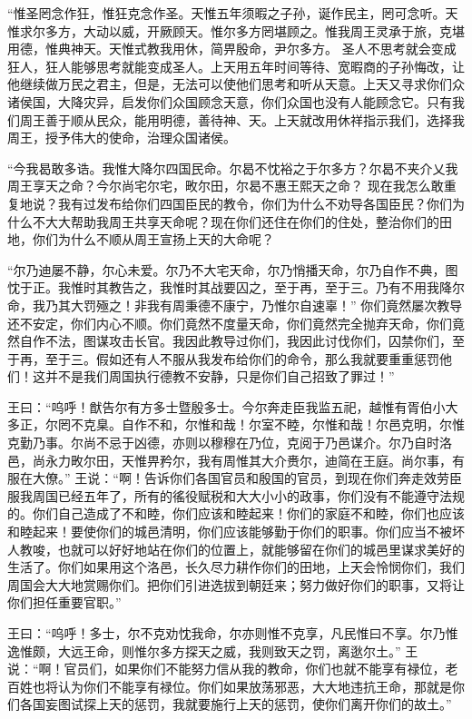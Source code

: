 \documentclass[a4paper,12pt,UTF8,twoside]{ctexbook}
\begin{document}
“惟圣罔念作狂，惟狂克念作圣。天惟五年须暇之子孙，诞作民主，罔可念听。天惟求尔多方，大动以威，开厥顾天。惟尔多方罔堪顾之。惟我周王灵承于旅，克堪用德，惟典神天。天惟式教我用休，简畀殷命，尹尔多方。
圣人不思考就会变成狂人，狂人能够思考就能变成圣人。上天用五年时间等待、宽暇商的子孙悔改，让他继续做万民之君主，但是，无法可以使他们思考和听从天意。上天又寻求你们众诸侯国，大降灾异，启发你们众国顾念天意，你们众国也没有人能顾念它。只有我们周王善于顺从民众，能用明德，善待神、天。上天就改用休祥指示我们，选择我周王，授予伟大的使命，治理众国诸侯。

“今我曷敢多诰。我惟大降尔四国民命。尔曷不忱裕之于尔多方？尔曷不夹介乂我周王享天之命？今尔尚宅尔宅，畋尔田，尔曷不惠王熙天之命？
现在我怎么敢重复地说？我有过发布给你们四国臣民的教令，你们为什么不劝导各国臣民？你们为什么不大大帮助我周王共享天命呢？现在你们还住在你们的住处，整治你们的田地，你们为什么不顺从周王宣扬上天的大命呢？

“尔乃迪屡不静，尔心未爱。尔乃不大宅天命，尔乃悄播天命，尔乃自作不典，图忱于正。我惟时其教告之，我惟时其战要囚之，至于再，至于三。乃有不用我降尔命，我乃其大罚殛之！非我有周秉德不康宁，乃惟尔自速辜！”
你们竟然屡次教导还不安定，你们内心不顺。你们竟然不度量天命，你们竟然完全抛弃天命，你们竟然自作不法，图谋攻击长官。我因此教导过你们，我因此讨伐你们，囚禁你们，至于再，至于三。假如还有人不服从我发布给你们的命令，那么我就要重重惩罚他们！这并不是我们周国执行德教不安静，只是你们自己招致了罪过！”

王曰：“呜呼！猷告尔有方多士暨殷多士。今尔奔走臣我监五祀，越惟有胥伯小大多正，尔罔不克臬。自作不和，尔惟和哉！尔室不睦，尔惟和哉！尔邑克明，尔惟克勤乃事。尔尚不忌于凶德，亦则以穆穆在乃位，克阅于乃邑谋介。尔乃自时洛邑，尚永力畋尔田，天惟畀矜尔，我有周惟其大介赉尔，迪简在王庭。尚尔事，有服在大僚。”
王说：“啊！告诉你们各国官员和殷国的官员，到现在你们奔走效劳臣服我周国已经五年了，所有的徭役赋税和大大小小的政事，你们没有不能遵守法规的。你们自己造成了不和睦，你们应该和睦起来！你们的家庭不和睦，你们也应该和睦起来！要使你们的城邑清明，你们应该能够勤于你们的职事。你们应当不被坏人教唆，也就可以好好地站在你们的位置上，就能够留在你们的城邑里谋求美好的生活了。你们如果用这个洛邑，长久尽力耕作你们的田地，上天会怜悯你们，我们周国会大大地赏赐你们。把你们引进选拔到朝廷来；努力做好你们的职事，又将让你们担任重要官职。”

王曰：“呜呼！多士，尔不克劝忱我命，尔亦则惟不克享，凡民惟曰不享。尔乃惟逸惟颇，大远王命，则惟尔多方探天之威，我则致天之罚，离逖尔土。”
王说：“啊！官员们，如果你们不能努力信从我的教命，你们也就不能享有禄位，老百姓也将认为你们不能享有禄位。你们如果放荡邪恶，大大地违抗王命，那就是你们各国妄图试探上天的惩罚，我就要施行上天的惩罚，使你们离开你们的故土。”
\end{document}
